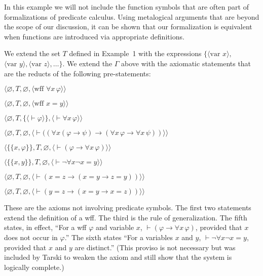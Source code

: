In this example we will not include the function symbols that are often part of
formalizations of predicate calculus.  Using metalogical arguments that are
beyond the scope of our discussion, it can be shown that our formalization is
equivalent when functions are introduced via appropriate definitions.

We extend the set $T$ defined in Example~1 with the expressions
$\{\langle \mbox{var\ } x\rangle,$ $ \langle \mbox{var\ } y\rangle, \langle
\mbox{var\ } z\rangle,\ldots\}$.  We extend the $\Gamma$ above
with the axiomatic statements that are the reducts of the following
pre-statements:
\begin{list}{}{\itemsep 0.0pt}
      \item[] $\langle\varnothing,T,\varnothing,
               \langle \mbox{wff\ }\forall x\,\varphi\rangle\rangle$
      \item[] $\langle\varnothing,T,\varnothing,
               \langle \mbox{wff\ }x=y\rangle\rangle$
      \item[] $\langle\varnothing,T,
               \{\langle\vdash\varphi\rangle\},
               \langle\vdash\forall x\,\varphi\rangle\rangle$
      \item[] $\langle\varnothing,T,\varnothing,
               \langle \vdash((\forall x(\varphi\to\psi)
                  \to(\forall x\,\varphi\to\forall x\,\psi))
               \rangle\rangle$
      \item[] $\langle\{\{x,\varphi\}\},T,\varnothing,
               \langle \vdash(\varphi\to\forall x\,\varphi)
               \rangle\rangle$
      \item[] $\langle\{\{x,y\}\},T,\varnothing,
               \langle \vdash\lnot\forall x\lnot x=y
               \rangle\rangle$
      \item[] $\langle\varnothing,T,\varnothing,
               \langle \vdash(x=z
                  \to(x=y\to z=y))
               \rangle\rangle$
      \item[] $\langle\varnothing,T,\varnothing,
               \langle \vdash(y=z
                  \to(x=y\to x=z))
               \rangle\rangle$
\end{list}
These are the axioms not involving predicate symbols. The first two statements
extend the definition of a wff.  The third is the rule of generalization.  The
fifth states, in effect, ``For a wff $\varphi$ and variable $x$,
$\vdash(\varphi\to\forall x\,\varphi)$, provided that $x$ does not occur in
$\varphi$.''  The sixth states ``For a variables $x$ and $y$,
$\vdash\lnot\forall x\lnot x = y$, provided that $x$ and $y$ are distinct.''
(This proviso is not necessary but was included by Tarski to
weaken the axiom and still show that the system is logically complete.)

